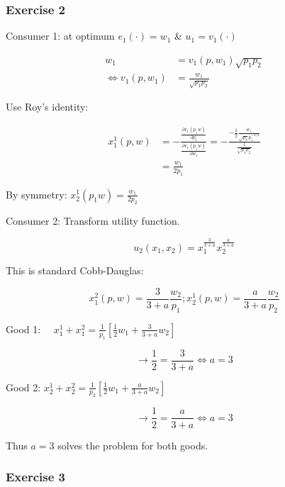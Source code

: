 {{\subsubsection*{Exercise 2}

\begin{enumerate}[label=(\alph*)]
{\item 
Consumer 1: at optimum $e_{1}(\cdot)=w_{1}$ \& $u_{1}=v_{1}(\cdot)$

$$
\begin{aligned}
w_{1} & =v_{1}\left(p, w_{1}\right) \sqrt{p_{1} p_{2}} \\
\Leftrightarrow v_{1}\left(p, w_1\right) & =\frac{w_{1}}{\sqrt{p_{1} p_{2}}}
\end{aligned}
$$

Use Roy's identity:

$$
\begin{aligned}
x_{1}^1(p, w) & =-\frac{\frac{\partial v_{1}\left(p_{1} w\right)}{\partial p_{1}}}{\frac{\partial v_{1}\left(p_{1} w\right)}{\partial w_{1}}}=-\frac{-\frac{1}{2} \frac{w_{1}}{\sqrt{p_{2}} p_{1}^{-3 / 2}}}{\frac{1}{\sqrt{p_{1} p_{2}}}} \\
& =\frac{w_{1}}{2 p_{1}}
\end{aligned}
$$

By symmetry: $x_{2}^1\left(p_{1} w\right)=\frac{w_{1}}{2 p_{2}}$

Consumer 2: Transform utility function.

$$
u_{2}\left(x_{1}, x_{2}\right)=x_{1}^{\frac{3}{3+a}} x_{2}^{\frac{a}{3+a}}
$$

This is standard Cobb-Dauglas:

$$
x_{1}^{2}(p, w)=\frac{3}{3+a} \frac{w_{2}}{p_{1}} ; x_{2}^1 (p, w)=\frac{a}{3+a} \frac{w_{2}}{p_{2}}
$$
}
{\item 
Good 1: $\quad x_{1}^{1}+x_{1}^{2}=\frac{1}{p_{1}}\left[\frac{1}{2} w_{1}+\frac{3}{3+a} w_{2}\right]$

$$
\longrightarrow \frac{1}{2}=\frac{3}{3+a} \Longleftrightarrow a=3
$$

Good 2: $x_{2}^{1}+x_{2}^{2}=\frac{1}{p_{2}}\left[\frac{1}{2} w_{1}+\frac{a}{3+a} w_{2}\right]$

$$
\longrightarrow \frac{1}{2}=\frac{a}{3+a} \Longleftrightarrow a=3
$$

Thus $a=3$ solves the problem for both goods.
}
\end{enumerate}
}
{
\subsubsection*{Exercise 3}

}}

